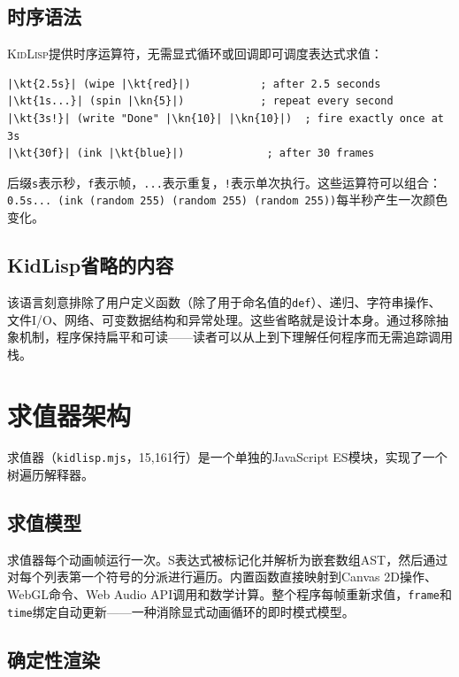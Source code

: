 \documentclass[10pt,letterpaper,twocolumn]{article}
\newcommand{\kn}[1]{\textcolor{klnum}{#1}}
\newcommand{\kt}[1]{\textcolor{klstr}{#1}}
\newcommand{\kidlisp}{\textsc{KidLisp}}
\begin{document}
\subsection{时序语法}

\kidlisp{}提供时序运算符，无需显式循环或回调即可调度表达式求值：

\begin{lstlisting}
|\kt{2.5s}| (wipe |\kt{red}|)           ; after 2.5 seconds
|\kt{1s...}| (spin |\kn{5}|)            ; repeat every second
|\kt{3s!}| (write "Done" |\kn{10}| |\kn{10}|)  ; fire exactly once at 3s
|\kt{30f}| (ink |\kt{blue}|)             ; after 30 frames
\end{lstlisting}

后缀\texttt{s}表示秒，\texttt{f}表示帧，\texttt{...}表示重复，\texttt{!}表示单次执行。这些运算符可以组合：\texttt{0.5s... (ink (random 255) (random 255) (random 255))}每半秒产生一次颜色变化。

\subsection{KidLisp省略的内容}

该语言刻意排除了用户定义函数（除了用于命名值的\texttt{def}）、递归、字符串操作、文件I/O、网络、可变数据结构和异常处理。这些省略就是设计本身。通过移除抽象机制，程序保持扁平和可读——读者可以从上到下理解任何程序而无需追踪调用栈。

\section{求值器架构}
\label{sec:architecture}

求值器（\texttt{kidlisp.mjs}，15,161行）是一个单独的JavaScript ES模块，实现了一个树遍历解释器。

\subsection{求值模型}

求值器每个动画帧运行一次。S表达式被标记化并解析为嵌套数组AST，然后通过对每个列表第一个符号的分派进行遍历。内置函数直接映射到Canvas 2D操作、WebGL命令、Web Audio API调用和数学计算。整个程序每帧重新求值，\texttt{frame}和\texttt{time}绑定自动更新——一种消除显式动画循环的即时模式模型。

\subsection{确定性渲染}
\end{document}
